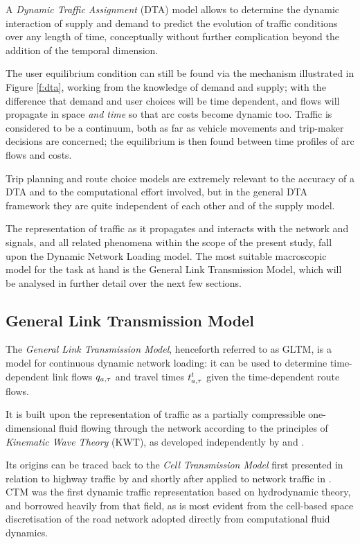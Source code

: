 A \emph{Dynamic Traffic Assignment} (DTA) model allows to determine the dynamic interaction of supply and demand to predict the evolution of traffic conditions over any length of time, conceptually without further complication beyond the addition of the temporal dimension.

The user equilibrium condition can still be found via the mechanism illustrated in Figure \ref{f:dta}, working from the knowledge of demand and supply; with the difference that demand and user choices will be time dependent, and flows will propagate in space \emph{and time} so that arc costs become dynamic too. Traffic is considered to be a continuum, both as far as vehicle movements and trip-maker decisions are concerned; the equilibrium is then found between time profiles of arc flows and costs.

Trip planning and route choice models are extremely relevant to the accuracy of a DTA and to the computational effort involved, but in the general DTA framework they are quite independent of each other and of the supply model.

The representation of traffic as it propagates and interacts with the network and signals, and all related phenomena within the scope of the present study, fall upon the Dynamic Network Loading model.
The most suitable macroscopic model for the task at hand is the General Link Transmission Model, which will be analysed in further detail over the next few sections.

\subsection{General Link Transmission Model}
The \emph{General Link Transmission Model}, henceforth referred to as GLTM, is a model for continuous dynamic network loading: it can be used to determine time-dependent link flows $q_{a,\tau}$ and travel times $t_{a,\tau}^t$ given the time-dependent route flows.

It is built upon the representation of traffic as a partially compressible one-dimensional fluid flowing through the network according to the principles of \emph{Kinematic Wave Theory} (KWT), as developed independently by \cite{lighthill1955kinematic} and \cite{richards1956shock}.

Its origins can be traced back to the \emph{Cell Transmission Model} first presented in relation to highway traffic by \cite{daganzo1994cell} and shortly after applied to network traffic in \citep{daganzo1995cell}. CTM was the first dynamic traffic representation based on hydrodynamic theory, and borrowed heavily from that field, as is most evident from the cell-based space discretisation of the road network adopted directly from computational fluid dynamics.

